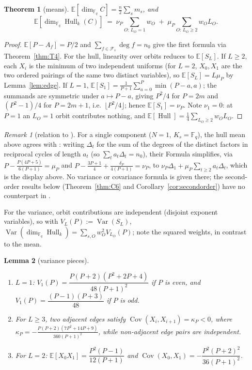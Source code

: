 \documentclass[10pt,journal,draftclsnofoot,onecolumn]{IEEEtran}
\newtheorem{theorem}{Theorem}[section]
\newtheorem{lemma}[theorem]{Lemma}
\theoremstyle{definition}
\theoremstyle{remark}
\newtheorem*{remark}{Remark}
\newcommand{\Fq}{\mathbb{F}_q}
\newcommand{\Hull}{\operatorname{Hull}}
\newcommand{\E}{\mathbb{E}}
\begin{document}
\begin{theorem}[means]\label{thm:C5}
\(\displaystyle \E[\dim_{\Fq} C] = \frac{n}{2} \sum_s m_s\), and
\[
\E[\dim_{\Fq} \Hull_k(C)] \;=\;
\nu_P \sum_{O:\, L_O = 1} w_O \;+\;
\mu_P \sum_{O:\, L_O \ge 2} w_O L_O .
\]
\end{theorem}

\begin{proof}
\(\E[P - A_f] = P/2\) and \(\sum_{f \in \mathcal{F}_s} \deg f = n_0\)
give the first formula via Theorem~\ref{thm:T4}. For the hull, linearity
over orbits reduces to \(\E[S_L]\). If \(L \ge 2\), each \(X_i\) is the
minimum of two independent uniforms (for \(L=2\), \(X_0, X_1\) are the
two ordered pairings of the same two distinct variables), so
\(\E[S_L] = L\mu_P\) by Lemma~\ref{lem:edge}. If \(L = 1\),
\(\E[S_1] = \frac{1}{P+1}\sum_{a=0}^P \min(P-a,a)\); the summands are
symmetric under \(a \mapsto P-a\), giving \(P^2/4\) for \(P = 2m\) and
\((P^2-1)/4\) for \(P = 2m+1\), i.e.\ \(\lfloor P^2/4 \rfloor\); hence
\(\E[S_1] = \nu_P\). Note \(\nu_1 = 0\): at \(P=1\) an \(L_O=1\) orbit
contributes nothing, and \(\E[\Hull] = \frac14 \sum_{L_O\ge2} w_O L_O\).
\end{proof}

\begin{remark}[relation to \cite{DP2025}]
For a single component (\(N = 1\), \(K_s = \Fq\)), the hull mean above
agrees with \cite[Theorem~3.3]{DP2025}: writing \(\Delta_t\) for the sum
of the degrees of the distinct factors in reciprocal cycles of length
\(a_t\) (so \(\sum_t a_t \Delta_t = n_0\)), their Formula simplifies,
via \(P - \frac{P(4P+5)}{6(P+1)} = \mu_P\) and
\(P - \frac{3P+1}{4} + \frac{\delta_P}{4(P+1)} = \nu_P\), to
\(\nu_P \Delta_1 + \mu_P \sum_{t \ge 2} a_t \Delta_t\), which is the
display above. No variance or covariance formula is given there; the
second-order results below (Theorem~\ref{thm:C6} and
Corollary~\ref{cor:secondorder}) have no counterpart in \cite{DP2025}.
\end{remark}

For the variance, orbit contributions are independent (disjoint exponent
variables), so with \(V_L(P) := \operatorname{Var}(S_L)\),
\(\operatorname{Var}(\dim_{\Fq}\Hull_k) = \sum_{s,O} w_O^2 V_{L_O}(P)\);
note the squared weights, in contrast to the mean.

\begin{lemma}[variance pieces]\label{lem:varpieces}
\begin{enumerate}
\item[(i)] \(L=1\):
\(V_1(P) = \dfrac{P(P+2)(P^2+2P+4)}{48(P+1)^2}\) if \(P\) is even, and
\(V_1(P) = \dfrac{(P-1)(P+3)}{48}\) if \(P\) is odd.
\item[(ii)] For \(L \ge 3\), two adjacent edges satisfy
\(\operatorname{Cov}(X_i, X_{i+1}) = \kappa_P < 0\), where
\(\kappa_P = -\frac{P(P+2)(7P^2+14P+9)}{360(P+1)^2}\), while non-adjacent edge pairs
are independent.
\item[(iii)] For \(L=2\):
\(\E[X_0 X_1] = \dfrac{P^2(P-1)}{12(P+1)}\) and
\(\operatorname{Cov}(X_0,X_1) = -\dfrac{P^2(P+2)^2}{36(P+1)^2}\).
\end{enumerate}
\end{lemma}
\end{document}
